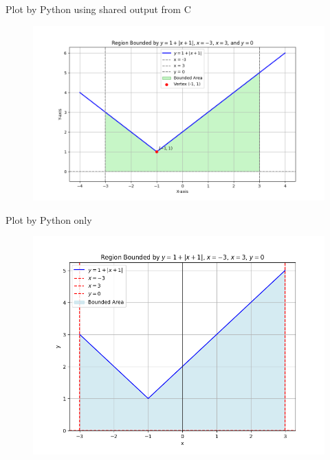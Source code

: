 \documentclass{beamer}
\begin{document}
\begin{frame}{Plot by Python using shared output from C}
\begin{figure}[H]
\centering
\includegraphics[width=1.0\columnwidth]{../figs/fig1.png}
\caption{}
\label{fig:1}
\end{figure}
\end{frame}

\begin{frame}{Plot by Python only}
\begin{figure}[H]
\centering
\includegraphics[width=0.7\columnwidth]{../figs/fig2.png}
\caption{}
\label{fig:2}
\end{figure}
\end{frame}
\end{document}
